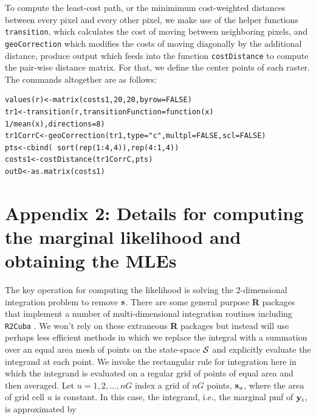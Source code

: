 \documentclass[12pt]{article}
\begin{document}
\begin{spacing}{1.2}
To compute the least-cost path, or the minimimum cost-weighted
distances between every pixel and every other pixel, we make use of 
the helper functions \mbox{\tt transition}, which
calculates the cost of moving between neighboring pixels, and
\mbox{\tt geoCorrection} which modifies the costs of moving diagonally
by the additional distance, produce output which feeds into the
function \mbox{\tt costDistance} to compute the pair-wise distance
matrix. For that, we define the center points of each raster.  The
commands altogether are as follows:

\begin{verbatim}
values(r)<-matrix(costs1,20,20,byrow=FALSE)
tr1<-transition(r,transitionFunction=function(x) 1/mean(x),directions=8)
tr1CorrC<-geoCorrection(tr1,type="c",multpl=FALSE,scl=FALSE)
pts<-cbind( sort(rep(1:4,4)),rep(4:1,4))
costs1<-costDistance(tr1CorrC,pts)
outD<-as.matrix(costs1)
\end{verbatim}


\section*{Appendix 2: Details for computing the marginal likelihood
  and obtaining the MLEs}


The key operation for computing the likelihood is solving the
2-dimensional integration problem to remove ${\bf s}$. There are some
general purpose {\bf R} packages that implement a number of
multi-dimensional integration routines including 
\mbox{\tt R2Cuba} \citep{hahn_etal:2011}.
We won't rely on these extraneous {\bf R} packages but instead will
use perhaps less efficient methods in which we replace the integral
with a summation over an equal area mesh of points on the state-space
${\cal S}$ and explicitly evaluate the integrand at each point. We
invoke the rectangular rule for integration here in which the
integrand is evaluated on a regular grid of points of equal area and
then averaged.  Let $u=1,2,\ldots,nG$ index a grid of $nG$ points,
${\bf s}_{u}$, where the area of grid cell $u$ is constant.  In this
case, the integrand, i.e., the marginal pmf of ${\bf y}_{i}$, is
approximated by


\end{spacing}
\end{document}
